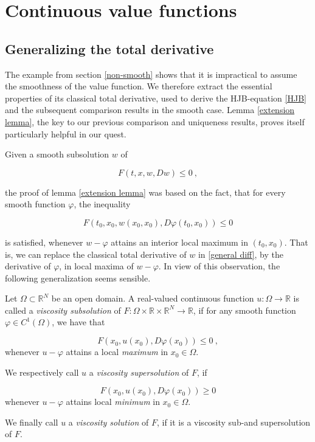 
\chapter{Continuous value functions}

	\section{Generalizing the total derivative}
	
	The example from section \ref{non-smooth} shows that it is impractical to assume the smoothness of the value function. We therefore extract the essential properties of its classical total derivative, used to derive the HJB-equation \ref{HJB} and the subsequent comparison results in the smooth case. Lemma \ref{extension lemma}, the key to our previous comparison and uniqueness results, proves itself particularly helpful in our quest.
	
	Given a smooth subsolution $ w $ of
	
	\begin{equation}
		\label{general diff}
		F(t, x, w, Dw) \leq 0 \ ,
	\end{equation}
	
	the proof of lemma \ref{extension lemma} was based on the fact, that for every smooth function $ \varphi $, the inequality 
	
	\begin{equation*}
		F(t_0, x_0, w(x_0, x_0), D\varphi(t_0, x_0)) \leq 0
	\end{equation*}
	
	is satisfied, whenever $ w - \varphi $ attains an interior local maximum in $ (t_0, x_0) $. That is, we can replace the classical total derivative of $ w $ in \ref{general diff}, by the derivative of $ \varphi $, in local maxima of $ w - \varphi $. In view of this observation, the following generalization seems sensible.
	
	\begin{definition}
		Let $ \Omega \subset \mathbb{R}^N $ be an open domain. A real-valued continuous function $ u : \Omega \to \mathbb{R} $ is called a \emph{viscosity subsolution} of $ F : \Omega \times \mathbb{R} \times \mathbb{R}^N \to \mathbb{R} $, if for any smooth function $ \varphi \in C^1(\Omega) $, we have that
		
		\begin{equation}
			\label{def viscosity subsolution}
			F(x_0, u(x_0), D \varphi(x_0)) \leq 0 \ ,
		\end{equation}
		whenever $ u - \varphi $ attains a local \emph{maximum} in $ x_0 \in \Omega $.
		
		We respectively call $ u $ a \emph{viscosity supersolution} of $ F $, if
		
		\begin{equation}
			\label{def viscosity supersolution}
			F(x_0, u(x_0), D\varphi(x_0)) \geq 0
		\end{equation}
		whenever $ u - \varphi $ attains local \emph{minimum} in $ x_0 \in \Omega $. 
		
		We finally call $ u $ a \emph{viscosity solution} of $ F $, if it is a viscosity sub-and supersolution of $ F $.
	\end{definition}

